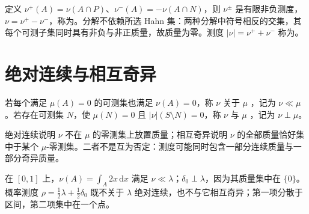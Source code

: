 \documentclass[UTF8,12pt,a4paper,fontset=fandol]{ctexbook}
\begin{document}
定义 $\nu^+(A)=\nu(A\cap P)$、$\nu^-(A)=-\nu(A\cap N)$，则 $\nu^\pm$ 是有限非负测度，$\nu=\nu^+-\nu^-$，称为。分解不依赖所选 Hahn 集：两种分解中符号相反的交集，其每个可测子集同时具有非负与非正质量，故质量为零。测度 $|\nu|=\nu^++\nu^-$ 称为。

\section{绝对连续与相互奇异}
\begin{definition}
若每个满足 $\mu(A)=0$ 的可测集也满足 $\nu(A)=0$，称 $\nu$ 关于 $\mu$ ，记为 $\nu\ll\mu$。若存在可测集 $N$，使 $\mu(N)=0$ 且 $|\nu|(S\setminus N)=0$，称 $\nu$ 与 $\mu$ ，记为 $\nu\perp\mu$。
\end{definition}
绝对连续说明 $\nu$ 不在 $\mu$ 的零测集上放置质量；相互奇异说明 $\nu$ 的全部质量恰好集中于某个 $\mu$-零测集。二者不是互为否定：测度可能同时包含一部分连续质量与一部分奇异质量。

\begin{example}
在 $[0,1]$ 上，$\nu(A)=\int_A2x\,\mathrm dx$ 满足 $\nu\ll\lambda$；$\delta_0\perp\lambda$，因为其质量集中在 $\{0\}$。概率测度 $\rho=\tfrac12\lambda+\tfrac12\delta_0$ 既不关于 $\lambda$ 绝对连续，也不与它相互奇异；第一项分散于区间，第二项集中在一个点。
\end{example}
\end{document}
